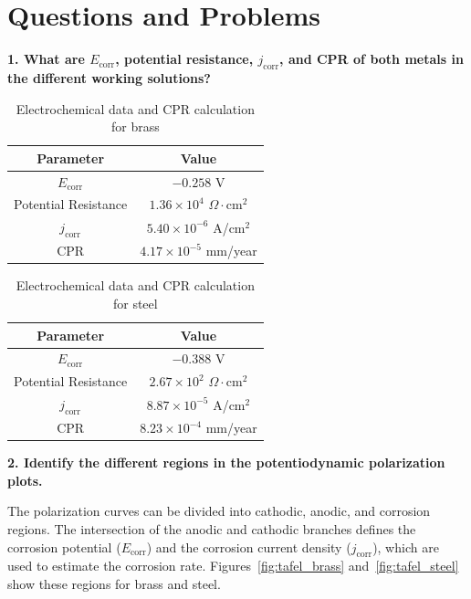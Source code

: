 \section{Questions and Problems}

\textbf{1. What are \( E_{\text{corr}} \), potential resistance, \( j_{\text{corr}} \), and CPR of both metals in the different working solutions?}

\begin{table}[h!]
\centering
\caption{Electrochemical data and CPR calculation for brass}
\label{tab:brass_parameters}
\begin{tabular}{|c|c|}
\hline
Parameter & Value \\
\hline
\( E_{\text{corr}} \) & \( -0.258 \) V \\
Potential Resistance & \( 1.36 \times 10^4 \) \( \Omega\cdot\text{cm}^2 \) \\
\( j_{\text{corr}} \) & \( 5.40 \times 10^{-6} \) A/cm\(^2\) \\
CPR & \( 4.17 \times 10^{-5} \) mm/year \\
\hline
\end{tabular}
\end{table}

\begin{table}[h!]
\centering
\caption{Electrochemical data and CPR calculation for steel}
\label{tab:steel_parameters}
\begin{tabular}{|c|c|}
\hline
Parameter & Value \\
\hline
\( E_{\text{corr}} \) & \( -0.388 \) V \\
Potential Resistance & \( 2.67 \times 10^2 \) \( \Omega\cdot\text{cm}^2 \) \\
\( j_{\text{corr}} \) & \( 8.87 \times 10^{-5} \) A/cm\(^2\) \\
CPR & \( 8.23 \times 10^{-4} \) mm/year \\
\hline
\end{tabular}
\end{table}

\vspace{0.5cm}

\textbf{2. Identify the different regions in the potentiodynamic polarization plots.}


The polarization curves can be divided into cathodic, anodic, and corrosion regions. 
The intersection of the anodic and cathodic branches defines the corrosion potential 
(\(E_{\text{corr}}\)) and the corrosion current density (\(j_{\text{corr}}\)), which are 
used to estimate the corrosion rate. Figures~\ref{fig:tafel_brass} and~\ref{fig:tafel_steel} 
show these regions for brass and steel.

